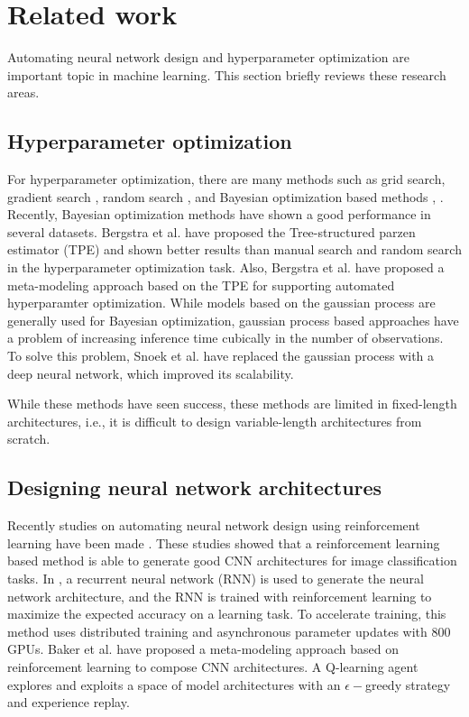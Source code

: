 
\section{Related work}
Automating neural network design and hyperparameter optimization are important topic in machine learning.
This section briefly reviews these research areas.

\subsection{Hyperparameter optimization}
For hyperparameter optimization, there are many methods such as grid search, gradient search \cite{bengio_gradient-based_2000}, random search \cite{bergstra_random_2012}, and Bayesian optimization based methods \cite{hutter_sequential_2011}, \cite{snoek_practical_2012}.
Recently, Bayesian optimization methods have shown a good performance in several datasets.
Bergstra et al. \cite{bergstra_algorithms_2011} have proposed the Tree-structured parzen estimator (TPE) and shown better results than manual search and random search \cite{bergstra_random_2012} in the hyperparameter optimization task.
Also, Bergstra et al. \cite{bergstra_making_2013} have proposed a meta-modeling approach based on the TPE for supporting automated hyperparamter optimization. 
While models based on the gaussian process are generally used for Bayesian optimization, gaussian process based approaches have a problem of increasing inference time cubically in the number of observations.
To solve this problem, Snoek et al. \cite{snoek_scalable_2015} have replaced the gaussian process with a deep neural network, which improved its scalability.

While these methods have seen success, these methods are limited in fixed-length architectures, i.e., it is difficult to design variable-length architectures from scratch.

\subsection{Designing neural network architectures}
Recently studies on automating neural network design using reinforcement learning have been made \cite{zoph_neural_2016} \cite{baker_designing_2016}.
These studies showed that a reinforcement learning based method is able to generate good CNN architectures for image classification tasks.
In \cite{zoph_neural_2016}, a recurrent neural network (RNN) is used to generate the neural network architecture, and the RNN is trained with reinforcement learning to maximize the expected accuracy on a learning task.
To accelerate training, this method uses distributed training and asynchronous parameter updates with $800$ GPUs.
Baker et al. \cite{baker_designing_2016} have proposed a meta-modeling approach based on reinforcement learning to compose CNN architectures.
A Q-learning agent explores and exploits a space of model architectures with an $\epsilon -$greedy strategy and experience replay.

